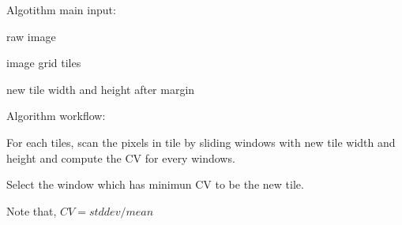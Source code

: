 Algotithm main input\-:


\begin{DoxyItemize}
\item raw image
\item image grid tiles
\item new tile width and height after margin
\end{DoxyItemize}

Algorithm workflow\-:


\begin{DoxyEnumerate}
\item For each tiles, scan the pixels in tile by sliding windows with new tile width and height and compute the C\-V for every windows.
\item Select the window which has minimun C\-V to be the new tile.
\end{DoxyEnumerate}

Note that, $ CV = stddev / mean $ 
